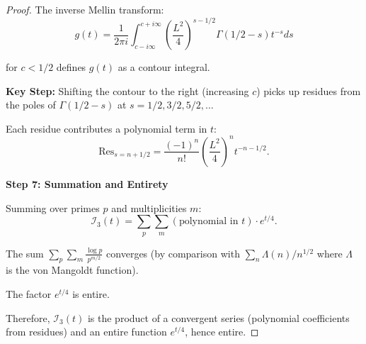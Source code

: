 \begin{theorem}
\begin{proof}
The inverse Mellin transform:
\begin{equation}
g(t) = \frac{1}{2\pi i} \int_{c - i\infty}^{c + i\infty}
\left(\frac{L^2}{4}\right)^{s-1/2} \Gamma(1/2 - s) t^{-s} ds
\end{equation}

for $c < 1/2$ defines $g(t)$ as a contour integral.

\textbf{Key Step:} Shifting the contour to the right (increasing $c$) picks up
residues from the poles of $\Gamma(1/2 - s)$ at $s = 1/2, 3/2, 5/2, \ldots$

Each residue contributes a polynomial term in $t$:
\begin{equation}
\mathrm{Res}_{s = n + 1/2} = \frac{(-1)^n}{n!} \left(\frac{L^2}{4}\right)^n t^{-n-1/2}.
\end{equation}

\textbf{Step 7: Summation and Entirety}

Summing over primes $p$ and multiplicities $m$:
\begin{equation}
\mathcal{I}_3(t) = \sum_p \sum_m (\text{polynomial in } t) \cdot e^{t/4}.
\end{equation}

The sum $\sum_p \sum_m \frac{\log p}{p^{m/2}}$ converges (by comparison with
$\sum_n \Lambda(n)/n^{1/2}$ where $\Lambda$ is the von Mangoldt function).

The factor $e^{t/4}$ is entire.

Therefore, $\mathcal{I}_3(t)$ is the product of a convergent series (polynomial
coefficients from residues) and an entire function $e^{t/4}$, hence entire.

\end{proof}

\end{theorem}

